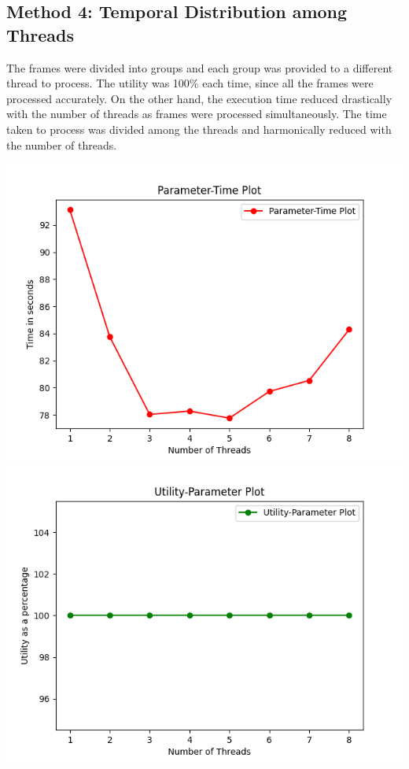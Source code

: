 \documentclass{article} %
\begin{document}
\subsection{Method 4: Temporal Distribution among Threads}
The frames were divided into groups and each group was provided to a different thread to process. The utility was 100\% each time, since all the frames were processed accurately. On the other hand, the execution time reduced drastically with the number of threads as frames were processed simultaneously. The time taken to process was divided among the threads and harmonically reduced with the number of threads.

\begin{center}
    \includegraphics[scale = 0.8]{out_images/method_4_time.png}
    \\\includegraphics[scale = 0.9]{out_images/method_4_utility_param.png}

\end{center}
\end{document}
